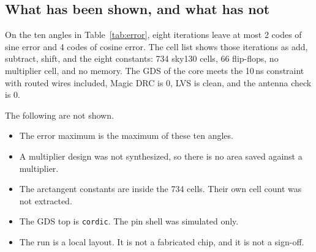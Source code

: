 \documentclass[11pt,a4paper]{article}
\begin{document}
\subsection{What has been shown, and what has not}
On the ten angles in Table~\ref{tab:error}, eight iterations leave at most 2 codes of sine error and 4 codes of cosine error. The cell list shows those iterations as add, subtract, shift, and the eight constants: 734 sky130 cells, 66 flip-flops, no multiplier cell, and no memory. The GDS of the core meets the 10\,ns constraint with routed wires included, Magic DRC is 0, LVS is clean, and the antenna check is 0.

The following are not shown.

\begin{itemize}
  \item The error maximum is the maximum of these ten angles.
  \item A multiplier design was not synthesized, so there is no area saved against a multiplier.
  \item The arctangent constants are inside the 734 cells. Their own cell count was not extracted.
  \item The GDS top is \texttt{cordic}. The pin shell was simulated only.
  \item The run is a local layout. It is not a fabricated chip, and it is not a sign-off.
\end{itemize}
\end{document}
